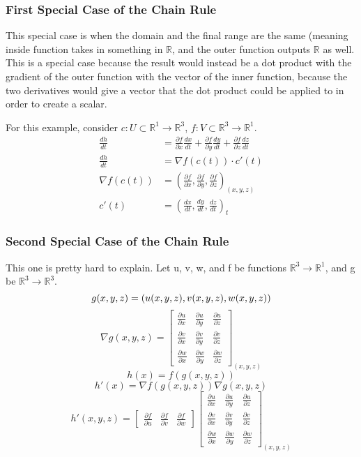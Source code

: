 \documentclass{article}
\begin{document}
\subsubsection{First Special Case of the Chain Rule}
This special case is when the domain and the final range are the same (meaning inside function takes in something in $\mathbb{R}$, and the outer function outputs $\mathbb{R}$ as well. This is a special case because the result would instead be a dot product with the gradient of the outer function with the vector of the inner function, because the two derivatives would give a vector that the dot product could be applied to in order to create a scalar.

For this example, consider $c: U \subset \mathbb{R}^1 \rightarrow \mathbb{R}^3$, $f: V \subset \mathbb{R}^3 \rightarrow \mathbb{R}^1$. 
\begin{align}
  \frac{dh}{dt} &= \frac{\partial f}{\partial x} \frac{dx}{dt} +\frac{\partial f}{\partial y} \frac{dy}{dt}+  \frac{\partial f}{\partial z} \frac{dz}{dt}\\
  \frac{dh}{dt} &= \nabla f(c(t)) \cdot c'(t)\\
  \nabla f(c(t)) &= (\frac{\partial f}{\partial x},\frac{\partial f}{\partial y},\frac{\partial f}{\partial z})_{(x,y,z)}\\
  c'(t) &= (\frac{dx}{dt},\frac{dy}{dt},\frac{dz}{dt})_{t}
\end{align}

\subsubsection{Second Special Case of the Chain Rule}
This one is pretty hard to explain. Let u, v, w, and f be functions $\mathbb{R}^3 \rightarrow \mathbb{R}^1$, and g be $\mathbb{R}^3 \rightarrow \mathbb{R}^3$.
\[
  g(x,y,z) = (u(x,y,z),v(x,y,z),w(x,y,z))\\
\]
\[
  \nabla g(x,y,z) = \begin{bmatrix}
    \frac{\partial u}{\partial x} & \frac{\partial u}{\partial y} & \frac{\partial u}{\partial z} \\ 
    \frac{\partial v}{\partial x} & \frac{\partial v}{\partial y} & \frac{\partial v}{\partial z} \\ 
    \frac{\partial w}{\partial x} & \frac{\partial w}{\partial y} & \frac{\partial w}{\partial z}
  \end{bmatrix}_{(x,y,z)}
\]
\[
    h(x) = f(g(x,y,z))
\]
\[
  h'(x) = \nabla f(g(x,y,z)) \nabla g(x,y,z)
\]
\[
    h'(x,y,z) = \begin{bmatrix}
      \frac{\partial f}{\partial u} & \frac{\partial f}{\partial v} & \frac{\partial f}{\partial w} 
    \end{bmatrix}
    \begin{bmatrix}
      \frac{\partial u}{\partial x} & \frac{\partial u}{\partial y} & \frac{\partial u}{\partial z} \\ 
      \frac{\partial v}{\partial x} & \frac{\partial v}{\partial y} & \frac{\partial v}{\partial z} \\ 
      \frac{\partial w}{\partial x} & \frac{\partial w}{\partial y} & \frac{\partial w}{\partial z}
    \end{bmatrix}_{(x,y,z)}
\]
\end{document}
